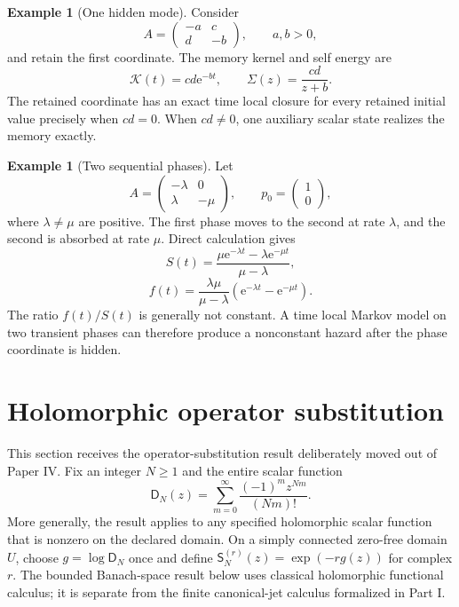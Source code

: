 \documentclass[11pt,a4paper]{article}
\theoremstyle{definition}
\newtheorem{example}[theorem]{Example}
\theoremstyle{remark}
\newcommand{\Dfun}{\mathsf D}
\newcommand{\Sfun}{\mathsf S}
\newcommand{\Kcal}{\mathcal K}
\newcommand{\e}{\mathrm e}
\begin{document}
\begin{example}[One hidden mode]\label{earlier:record:029}\label{earlier:ex:one_hidden_mode}
Consider
\[
A=
\begin{pmatrix}
-a&c\\
d&-b
\end{pmatrix},
\qquad
a,b>0,
\]
and retain the first coordinate. The memory kernel and self energy are
\[
\Kcal(t)=cd\e^{-bt},
\qquad
\Sigma(z)=\frac{cd}{z+b}.
\]
The retained coordinate has an exact time local closure for every retained initial value precisely when \(cd=0\). When \(cd\neq0\), one auxiliary scalar state realizes the memory exactly.
\end{example}

\begin{example}[Two sequential phases]\label{earlier:record:030}\label{earlier:ex:two_phase_survival}
Let
\[
A=
\begin{pmatrix}
-\lambda&0\\
\lambda&-\mu
\end{pmatrix},
\qquad
p_0=
\begin{pmatrix}1\\0\end{pmatrix},
\]
where \(\lambda\neq\mu\) are positive. The first phase moves to the second at rate \(\lambda\), and the second is absorbed at rate \(\mu\). Direct calculation gives
\[
S(t)=
\frac{\mu\e^{-\lambda t}-\lambda\e^{-\mu t}}{\mu-\lambda},
\]
\[
f(t)=
\frac{\lambda\mu}{\mu-\lambda}
\left(\e^{-\lambda t}-\e^{-\mu t}\right).
\]
The ratio \(f(t)/S(t)\) is generally not constant. A time local Markov model on two transient phases can therefore produce a nonconstant hazard after the phase coordinate is hidden.
\end{example}

\section{Holomorphic operator substitution}\label{migration:section:01}\label{migration:sec:operator_substitution}

This section receives the operator-substitution result deliberately moved out of Paper IV. Fix an integer $N\geq1$ and the entire scalar function
\[
\Dfun_N(z)=\sum_{m=0}^{\infty}\frac{(-1)^m z^{Nm}}{(Nm)!}.
\]
More generally, the result applies to any specified holomorphic scalar function that is nonzero on the declared domain. On a simply connected zero-free domain $U$, choose $g=\log\Dfun_N$ once and define $\Sfun_N^{(r)}(z)=\exp(-r g(z))$ for complex $r$. The bounded Banach-space result below uses classical holomorphic functional calculus; it is separate from the finite canonical-jet calculus formalized in Part I.
\end{document}
